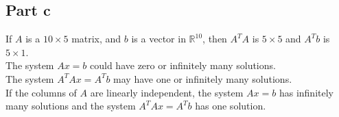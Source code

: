 \documentclass{article}
\begin{document}
\subsection{Part c}
If $A$ is a $10 \times 5$ matrix, and $b$ is a vector in $\mathbb{R}^{10}$, then $A^TA$ is $5\times5$ and $A^Tb$ is $5\times1$.\\
The system $Ax=b$ could have zero or infinitely many solutions.\\
The system $A^TAx=A^Tb$ may have one or infinitely many solutions. \\
If the columns of $A$ are linearly independent, the system $Ax=b$ has infinitely many solutions and the system $A^TAx=A^Tb$ has one solution.
\end{document}
